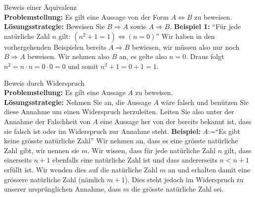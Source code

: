 \begin{howto}{Beweis einer Äquivalenz}\\
 \textbf{Problemstellung:} Es gilt eine Aussage von der Form $A\Leftrightarrow B$ zu beweisen.\\
   \textbf{Lösungsstrategie:} Beweisen Sie $B\Rightarrow A$ sowie $A\Rightarrow B$.
   \tcblower
  \textbf{Beispiel 1:} ``Für jede natürliche Zahl $n$ gilt: $(n^2+1=1)\Leftrightarrow (n=0)$''
Wir haben in den vorhergehenden Beispielen bereits $A\Rightarrow B$ bewiesen, wir müssen also nur noch $B\Rightarrow A$ beweisen. Wir nehmen also $B$ an, es gelte also $n=0$. Draus folgt $n^2=n\cdot n=0\cdot 0=0$ und somit $n^2+1=0+1=1$.
\begin{comment}
    \textbf{Beispiel 2:} ``Für jede natürliche Zahl $n$ gilt: $(n\text{ ist gerade})\Leftrightarrow (n^2\text{ ist gerade}).$''
Wir beweisen zuerst $(n\text{ ist gerade})\Rightarrow (n^2\text{ ist gerade})$. Wir nehmen also an, dass $n$ eine gerade natürliche Zahl ist. Daraus folgt, dass es eine weitere natürliche Zahl $k$ mit $n=2\cdot k$ gibt. Es folgt, dass
\[
n^2=n\cdot n=2\cdot k\cdot 2\cdot k=2\cdot (k\cdot 2\cdot k)
\]
offenbar gerade ist.\\
Nun wollen wir noch die ``Rückrichtung'' $(n\text{ ist gerade})\Leftarrow (n^2\text{ ist gerade})$ beweisen. Wir wollen diese Richtung durch Kontraposition beweisen und nehmen also an, dass $n$ ungerade sei. Es folgt, dass es eine natürliche Zahl $k$ mit $2k+1=n$ gibt. Folglich gilt:
\[
  n^2=(2k+1)(2k+1)=4k^2+4k+1=\underbrace{4(k^2+k)}_{\text{gerade}}+1.
\]
Also ist $n^2$ ungerade.
\end{comment}
\end{howto}



\begin{howto}{Beweis durch Widerspruch}\\
    \textbf{Problemstellung:} Es gilt eine Aussage $A$ zu beweisen.\\
    \textbf{Lösungsstrategie:} Nehmen Sie an, die Aussage $A$ wäre falsch und benützen Sie diese Annahme um einen Widerspruch herzuleiten. Leiten Sie also unter der Annahme der Falschheit von $A$ eine Aussage her von der bereits bekannt ist, dass sie falsch ist oder im Widerspruch zur Annahme steht.
    \tcblower
    \textbf{Beispiel:} $A$:=``Es gibt keine grösste natürliche Zahl''
     Wir nehmen an, dass es eine grösste natürliche Zahl gibt, wir nennen sie $m$. Wir wissen, dass
    für jede natürliche Zahl $n$ gilt, dass einerseits $n+1$ ebenfalls eine natürliche Zahl ist und dass
    andererseits $n<n+1$ erfüllt ist. Wir wenden dies auf die natürliche Zahl $m$ an und erhalten
    damit eine grössere natürliche Zahl (nämlich $m+1$). Dies steht jedoch im
    Widerspruch zu unserer ursprünglichen Annahme, dass $m$ die grösste natürliche Zahl sei.
\end{howto}


